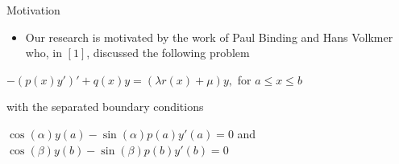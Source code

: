 \documentclass{beamer}
\begin{document}
\begin{frame}{Motivation}

\vspace*{-20mm}

\begin{itemize}

\item Our research is motivated by the work of Paul Binding and Hans Volkmer who, in $[1]$, discussed the following problem

\end{itemize}

\begin{block}

\begin{center}

$-(p(x)y')'+q(x)y=(\lambda r(x)+\mu)y,$ for $a \leq x \leq b$

\vspace{2mm}

with the separated boundary conditions

\vspace{2mm}

$\cos(\alpha)y(a)-\sin(\alpha)p(a)y'(a)=0$ and $\cos(\beta)y(b)-\sin(\beta)p(b)y'(b)=0$

\end{center}

\end{block}

\end{frame}
\end{document}
